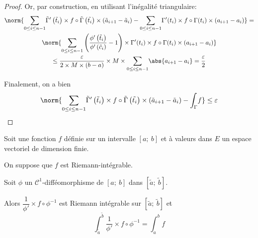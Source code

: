\begin{proof}
Or, par construction, en utilisant l'inégalité triangulaire:
\begin{multline*}
\norm{\displaystyle{\sum \limits_{0 \leq i \leq n-1}} \tilde{\Gamma}'\left(\tilde{t}_i\right) \times f\circ \tilde{\Gamma}\left(\tilde{t_i}\right) \times \left(\tilde{a}_{i+1}-\tilde{a}_i\right) - \displaystyle{\sum \limits_{0 \leq i \leq n-1}}   \Gamma'(t_i) \times f\circ \Gamma(t_i) \times \left(a_{i+1}-a_i\right)} = \\
\norm{\displaystyle{\sum \limits_{0 \leq i \leq n-1}} \left( \dfrac{\phi'\left(\tilde{t}_i\right)}{\phi'\left(\tilde{c}_i\right)}-1 \right) \times   \Gamma'(t_i) \times f\circ \Gamma(t_i) \times \left(a_{i+1}-a_i\right)} \\
\leq \dfrac{\varepsilon}{2 \times M \times (b-a)} \times M \times \displaystyle{\sum \limits_{0 \leq i \leq n-1}} \abs{a_{i+1}-a_i} = \dfrac{\varepsilon}{2}
\end{multline*}

Finalement, on a bien
\[
\norm{\displaystyle{\sum \limits_{0 \leq i \leq n-1}} \tilde{\Gamma}'\left(\tilde{t}_i\right) \times f\circ \tilde{\Gamma}\left(\tilde{t_i}\right) \times \left(\tilde{a}_{i+1}-\tilde{a}_i\right) - \displaystyle{\int_{\Gamma}} f} \leq \varepsilon
\]
\end{proof}


\begin{cor}
Soit une fonction $f$ définie sur un intervalle $[a;~b]$ et à valeurs dans $E$ un espace vectoriel de dimension finie. 

On suppose que $f$ est Riemann-intégrable.

Soit $\phi$ un $\mathcal{C}^1$-difféomorphisme de $[a;~b]$ dans $\left[\tilde{a};~\tilde{b}\right]$.

Alors $\dfrac{1}{\phi'} \times f \circ \phi^{-1}$ est Riemann intégrable sur $\left[\tilde{a};~\tilde{b}\right]$ et 
\[
\displaystyle{\int_{\tilde{a}}^{\tilde{b}}} \dfrac{1}{\phi'} \times f \circ \phi^{-1} = \displaystyle{\int_{a}^{b}} f
\]
\end{cor}





